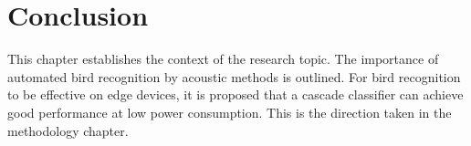 \section{Conclusion}

This chapter establishes the context of the research topic.
The importance of automated bird recognition by acoustic methods is outlined.
For bird recognition to be effective on edge devices, it is proposed that a cascade classifier can achieve good performance at low power consumption.
This is the direction taken in the methodology chapter.